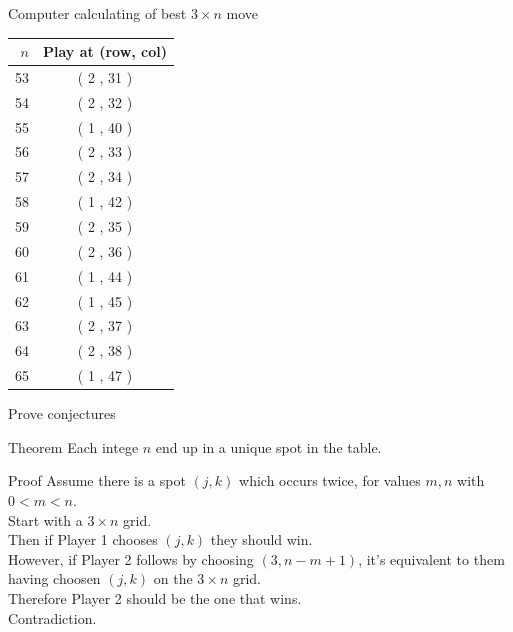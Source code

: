 \documentclass{beamer}
\begin{document}
\begin{frame}{Computer calculating of best $3\times n$ move}
\begin{center}
\begin{tabular}{r|c}
\hline
$n$ & Play at (row, col) \\
\hline
53  & ( 2 , 31 ) \\
54  & ( 2 , 32 ) \\
55  & ( 1 , 40 ) \\
56  & ( 2 , 33 ) \\
57  & ( 2 , 34 ) \\
58  & ( 1 , 42 ) \\
59  & ( 2 , 35 ) \\
60  & ( 2 , 36 ) \\
61  & ( 1 , 44 ) \\
62  & ( 1 , 45 ) \\
63  & ( 2 , 37 ) \\
64  & ( 2 , 38 ) \\
65  & ( 1 , 47 ) \\
\end{tabular}
\end{center}
\end{frame}


\begin{frame}{Prove conjectures}
  \begin{block}{Theorem}
    Each intege $n$ end up in a unique spot in the table.
  \end{block}
\pause
  \begin{block}{Proof}
    Assume there is a spot $(j,k)$ which occurs twice, for values $m,n$ with $0<m<n$.\\
\pause
    Start with a $3\times n$ grid.\\
\pause
    Then if {\color{blue}Player 1} chooses $(j,k)$ they should win.\\
\pause
    However, if {\color{red}Player 2} follows by choosing $(3,n-m+1)$, it's equivalent to them having choosen $(j,k)$ on the $3\times n$ grid.\\
\pause
    Therefore {\color{red}Player 2} should be the one that wins.\\
\pause
    Contradiction.
  \end{block}
\end{frame}
\end{document}
